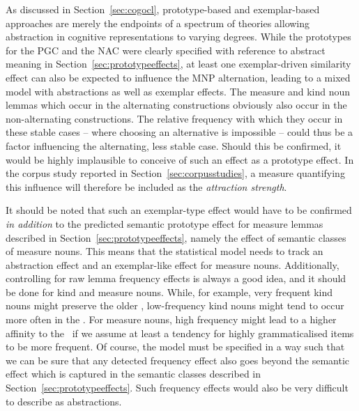 As discussed in Section~\ref{sec:cogocl}, prototype-based and exemplar-based approaches are merely the endpoints of a spectrum of theories allowing abstraction in cognitive representations to varying degrees.
While the prototypes for the PGC and the NAC were clearly specified with reference to abstract meaning in Section~\ref{sec:prototypeeffects}, at least one exemplar-driven similarity effect can also be expected to influence the MNP alternation, leading to a mixed model with abstractions as well as exemplar effects.
The measure and kind noun lemmas which occur in the alternating constructions obviously also occur in the non-alternating constructions.
The relative frequency with which they occur in these stable cases -- where choosing an alternative is impossible -- could thus be a factor influencing the alternating, less stable case.
Should this be confirmed, it would be highly implausible to conceive of such an effect as a prototype effect.
In the corpus study reported in Section~\ref{sec:corpusstudies}, a measure quantifying this influence will therefore be included as the \textit{attraction strength}.

It should be noted that such an exemplar-type effect would have to be confirmed \textit{in addition} to the predicted semantic prototype effect for measure lemmas described in Section~\ref{sec:prototypeeffects}, namely the effect of semantic classes of measure nouns.
This means that the statistical model needs to track an abstraction effect and an exemplar-like effect for measure nouns.
Additionally, controlling for raw lemma frequency effects is always a good idea, and it should be done for kind and measure nouns.
While, for example, very frequent kind nouns might preserve the older \PGCa, low-frequency kind nouns might tend to occur more often in the \NACa.
For measure nouns, high frequency might lead to a higher affinity to the \NACa\ if we assume at least a tendency for highly grammaticalised items to be more frequent.
Of course, the model must be specified in a way such that we can be sure that any detected frequency effect also goes beyond the semantic effect which is captured in the semantic classes described in Section~\ref{sec:prototypeeffects}.
Such frequency effects would also be very difficult to describe as abstractions.


